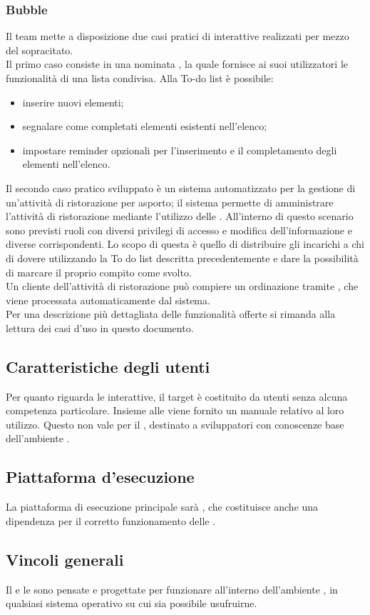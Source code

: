\subsubsection{Bubble}
Il team \GroupName{} mette a disposizione due casi pratici di  interattive realizzati per mezzo del  sopracitato.\\
Il primo caso consiste in una  nominata , la quale fornisce ai suoi utilizzatori le funzionalità di una lista condivisa. Alla To-do list è possibile:
\begin{itemize}
	\item inserire nuovi elementi;
	\item segnalare come completati elementi esistenti nell'elenco;
	\item impostare reminder opzionali per l'inserimento e il completamento degli elementi nell'elenco.
\end{itemize}
Il secondo caso pratico sviluppato è un sistema automatizzato per la gestione di un'attività di ristorazione per asporto; il sistema permette di amministrare l'attività di ristorazione mediante l'utilizzo delle . All'interno di questo scenario sono previsti ruoli con diversi privilegi di accesso e modifica dell'informazione e diverse  corrispondenti.
Lo scopo di questa  è quello di distribuire gli incarichi a chi di dovere utilizzando la  To do list descritta precedentemente e dare la possibilità di marcare il proprio compito come svolto.\\
Un cliente dell'attività di ristorazione può compiere un ordinazione tramite , che viene processata automaticamente dal sistema.\\
Per una descrizione più dettagliata delle funzionalità offerte si rimanda alla lettura dei casi d'uso in questo documento.

\subsection{Caratteristiche degli utenti}
Per quanto riguarda le  interattive, il target è costituito da utenti senza alcuna competenza particolare. Insieme alle  viene fornito un manuale relativo al loro utilizzo. Questo non vale per il , destinato a sviluppatori con conoscenze base dell'ambiente . 

\subsection{Piattaforma d'esecuzione}
La piattaforma di esecuzione principale sarà , che costituisce anche una dipendenza per il corretto funzionamento delle .

\subsection{Vincoli generali}
Il  e le  sono pensate e progettate per funzionare all'interno dell'ambiente , in qualsiasi sistema operativo su cui sia possibile usufruirne.


